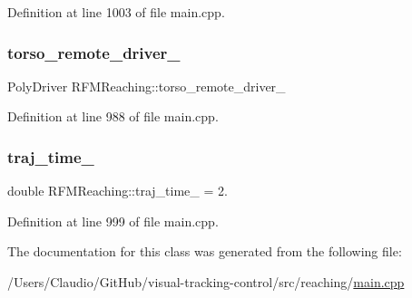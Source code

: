 Definition at line 1003 of file main.\+cpp.

\mbox{\label{classRFMReaching_a0425996ad8eafc74f58fc8ac3db7fa85}} 
\subsubsection{\texorpdfstring{torso\+\_\+remote\+\_\+driver\+\_\+}{torso\_remote\_driver\_}}
{\footnotesize\ttfamily Poly\+Driver R\+F\+M\+Reaching\+::torso\+\_\+remote\+\_\+driver\+\_\+\hspace{0.3cm}{\ttfamily [private]}}



Definition at line 988 of file main.\+cpp.

\mbox{\label{classRFMReaching_ab8b1ebb26099043288c6b6da5fe7ee9b}} 
\subsubsection{\texorpdfstring{traj\+\_\+time\+\_\+}{traj\_time\_}}
{\footnotesize\ttfamily double R\+F\+M\+Reaching\+::traj\+\_\+time\+\_\+ = 2.\hspace{0.3cm}{\ttfamily [private]}}



Definition at line 999 of file main.\+cpp.



The documentation for this class was generated from the following file\+:\begin{DoxyCompactItemize}
\item 
/\+Users/\+Claudio/\+Git\+Hub/visual-\/tracking-\/control/src/reaching/\hyperlink{reaching_2main_8cpp}{main.\+cpp}\end{DoxyCompactItemize}
